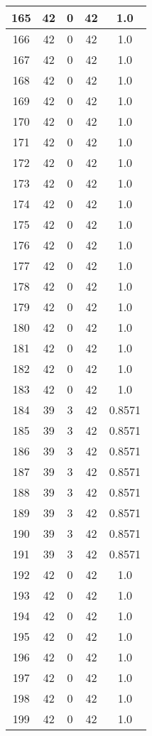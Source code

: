 \documentclass[letterpaper, 12pt]{article}
\begin{document}
\begin{longtable}{|c|c|c|c|c|}
\hline
165 & 42 & 0 & 42 & 1.0 \\
\hline
166 & 42 & 0 & 42 & 1.0 \\
\hline
167 & 42 & 0 & 42 & 1.0 \\
\hline
168 & 42 & 0 & 42 & 1.0 \\
\hline
169 & 42 & 0 & 42 & 1.0 \\
\hline
170 & 42 & 0 & 42 & 1.0 \\
\hline
171 & 42 & 0 & 42 & 1.0 \\
\hline
172 & 42 & 0 & 42 & 1.0 \\
\hline
173 & 42 & 0 & 42 & 1.0 \\
\hline
174 & 42 & 0 & 42 & 1.0 \\
\hline
175 & 42 & 0 & 42 & 1.0 \\
\hline
176 & 42 & 0 & 42 & 1.0 \\
\hline
177 & 42 & 0 & 42 & 1.0 \\
\hline
178 & 42 & 0 & 42 & 1.0 \\
\hline
179 & 42 & 0 & 42 & 1.0 \\
\hline
180 & 42 & 0 & 42 & 1.0 \\
\hline
181 & 42 & 0 & 42 & 1.0 \\
\hline
182 & 42 & 0 & 42 & 1.0 \\
\hline
183 & 42 & 0 & 42 & 1.0 \\
\hline
184 & 39 & 3 & 42 & 0.8571 \\
\hline
185 & 39 & 3 & 42 & 0.8571 \\
\hline
186 & 39 & 3 & 42 & 0.8571 \\
\hline
187 & 39 & 3 & 42 & 0.8571 \\
\hline
188 & 39 & 3 & 42 & 0.8571 \\
\hline
189 & 39 & 3 & 42 & 0.8571 \\
\hline
190 & 39 & 3 & 42 & 0.8571 \\
\hline
191 & 39 & 3 & 42 & 0.8571 \\
\hline
192 & 42 & 0 & 42 & 1.0 \\
\hline
193 & 42 & 0 & 42 & 1.0 \\
\hline
194 & 42 & 0 & 42 & 1.0 \\
\hline
195 & 42 & 0 & 42 & 1.0 \\
\hline
196 & 42 & 0 & 42 & 1.0 \\
\hline
197 & 42 & 0 & 42 & 1.0 \\
\hline
198 & 42 & 0 & 42 & 1.0 \\
\hline
199 & 42 & 0 & 42 & 1.0 \\
\hline
\end{longtable}
\end{document}

